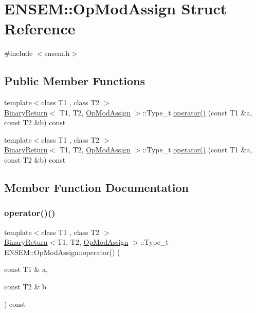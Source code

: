 \hypertarget{structENSEM_1_1OpModAssign}{}\section{E\+N\+S\+EM\+:\+:Op\+Mod\+Assign Struct Reference}
\label{structENSEM_1_1OpModAssign}


{\ttfamily \#include $<$ensem.\+h$>$}

\subsection*{Public Member Functions}
\begin{DoxyCompactItemize}
\item 
{\footnotesize template$<$class T1 , class T2 $>$ }\\\mbox{\hyperlink{structENSEM_1_1BinaryReturn}{Binary\+Return}}$<$ T1, T2, \mbox{\hyperlink{structENSEM_1_1OpModAssign}{Op\+Mod\+Assign}} $>$\+::Type\+\_\+t \mbox{\hyperlink{structENSEM_1_1OpModAssign_a3d9009924395ef97f9d281e378953c06}{operator()}} (const T1 \&a, const T2 \&b) const
\item 
{\footnotesize template$<$class T1 , class T2 $>$ }\\\mbox{\hyperlink{structENSEM_1_1BinaryReturn}{Binary\+Return}}$<$ T1, T2, \mbox{\hyperlink{structENSEM_1_1OpModAssign}{Op\+Mod\+Assign}} $>$\+::Type\+\_\+t \mbox{\hyperlink{structENSEM_1_1OpModAssign_a3d9009924395ef97f9d281e378953c06}{operator()}} (const T1 \&a, const T2 \&b) const
\end{DoxyCompactItemize}


\subsection{Member Function Documentation}
\mbox{\label{structENSEM_1_1OpModAssign_a3d9009924395ef97f9d281e378953c06}} 
\subsubsection{\texorpdfstring{operator()()}{operator()()}\hspace{0.1cm}{\footnotesize\ttfamily [1/2]}}
{\footnotesize\ttfamily template$<$class T1 , class T2 $>$ \\
\mbox{\hyperlink{structENSEM_1_1BinaryReturn}{Binary\+Return}}$<$T1, T2, \mbox{\hyperlink{structENSEM_1_1OpModAssign}{Op\+Mod\+Assign}} $>$\+::Type\+\_\+t E\+N\+S\+E\+M\+::\+Op\+Mod\+Assign\+::operator() (\begin{DoxyParamCaption}\item[{const T1 \&}]{a,  }\item[{const T2 \&}]{b }\end{DoxyParamCaption}) const\hspace{0.3cm}{\ttfamily [inline]}}

